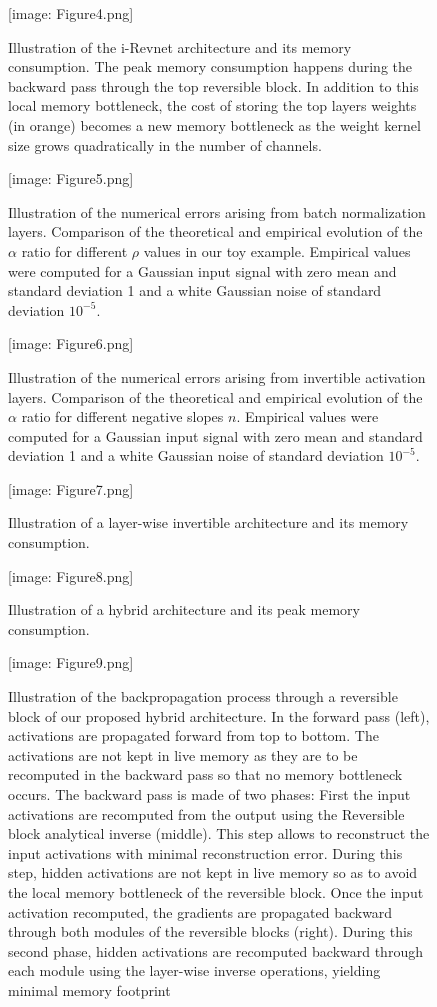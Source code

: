 \documentclass[twocolumn]{bmcart}
\def\texttt{[image: ]}
\begin{document}
\begin{backmatter}
\begin{figure}[t]
\texttt{[image: Figure4.png]}
\caption{
Illustration of the i-Revnet architecture and its memory consumption.
The peak memory consumption happens during the backward pass through the top reversible block.
In addition to this local memory bottleneck, the cost of storing the top layers weights
(in orange) becomes a new memory bottleneck as the
weight kernel size grows quadratically in the number of channels.
}
\end{figure}


\begin{figure}[t]
\texttt{[image: Figure5.png]}
\caption{
Illustration of the numerical errors arising from batch normalization layers.
Comparison of the theoretical and empirical evolution of the $\alpha$ ratio for different $\rho$ values in our toy example.
Empirical values were computed for a Gaussian input signal with zero mean and standard deviation 1 and a white Gaussian noise of standard deviation $10^{-5}$.
}
\end{figure}

\begin{figure}[t]
\texttt{[image: Figure6.png]}
\caption{
Illustration of the numerical errors arising from invertible activation layers.
Comparison of the theoretical and empirical evolution of the $\alpha$ ratio for different negative slopes $n$.
Empirical values were computed for a Gaussian input signal with zero mean and standard deviation 1 and a white Gaussian noise of standard deviation $10^{-5}$.
}
\end{figure}
\begin{figure}[t]
\texttt{[image: Figure7.png]}
\caption{
Illustration of a layer-wise invertible architecture and its memory consumption.
}
\end{figure}

\begin{figure}[t]
\texttt{[image: Figure8.png]}
\caption{
Illustration of a hybrid architecture and its peak memory consumption.
}
\end{figure}

\begin{figure}[t]
\texttt{[image: Figure9.png]}
\caption{
Illustration of the backpropagation process through a reversible block of our proposed hybrid architecture.
In the forward pass (left), activations are propagated forward from top to bottom.
The activations are not kept in live memory as they are to be recomputed in the backward pass so that no memory bottleneck occurs.
The backward pass is made of two phases:
First the input activations are recomputed from the output using the Reversible block analytical inverse (middle).
This step allows to reconstruct the input activations with minimal reconstruction error.
During this step, hidden activations are not kept in live memory so as to avoid the local memory bottleneck of the reversible block.
Once the input activation recomputed, the gradients are propagated backward through both modules of the reversible blocks (right).
During this second phase, hidden activations are recomputed backward through each module using the layer-wise inverse operations, yielding minimal memory footprint
}
\end{figure}



\end{backmatter}
\end{document}
